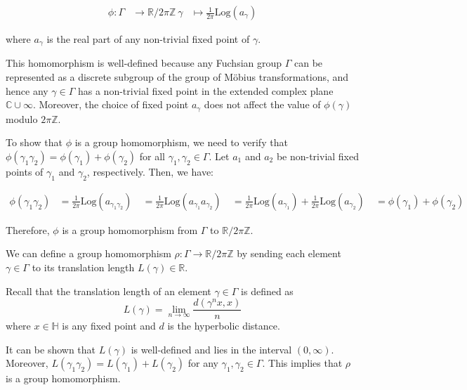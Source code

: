 \documentclass[12pt,a4paper,english]{article}
\theoremstyle{plain}
\theoremstyle{definition}
\theoremstyle{remark}
\begin{document}
\begin{align} \phi: \Gamma &\rightarrow \mathbb{R}/2\pi\mathbb{Z} \ \gamma &\mapsto \frac{1}{2\pi}\text{Log}(a_\gamma) \end{align}

where $a_\gamma$ is the real part of any non-trivial fixed point of $\gamma$.

This homomorphism is well-defined because any Fuchsian group $\Gamma$ can be represented as a discrete subgroup of the group of Möbius transformations, and hence any $\gamma \in \Gamma$ has a non-trivial fixed point in the extended complex plane $\mathbb{C}\cup{\infty}$. Moreover, the choice of fixed point $a_\gamma$ does not affect the value of $\phi(\gamma)$ modulo $2\pi\mathbb{Z}$.

To show that $\phi$ is a group homomorphism, we need to verify that $\phi(\gamma_1\gamma_2) = \phi(\gamma_1) + \phi(\gamma_2)$ for all $\gamma_1,\gamma_2 \in \Gamma$. Let $a_1$ and $a_2$ be non-trivial fixed points of $\gamma_1$ and $\gamma_2$, respectively. Then, we have:

\begin{align} \phi(\gamma_1\gamma_2) &= \frac{1}{2\pi}\text{Log}(a_{\gamma_1\gamma_2}) \ &= \frac{1}{2\pi}\text{Log}(a_{\gamma_1}a_{\gamma_2}) \ &= \frac{1}{2\pi}\text{Log}(a_{\gamma_1}) + \frac{1}{2\pi}\text{Log}(a_{\gamma_2}) \ &= \phi(\gamma_1) + \phi(\gamma_2) \end{align}

Therefore, $\phi$ is a group homomorphism from $\Gamma$ to $\mathbb{R}/2\pi\mathbb{Z}$.



We can define a group homomorphism $\rho: \Gamma \to \mathbb{R}/2\pi\mathbb{Z}$ by sending each element $\gamma \in \Gamma$ to its translation length $L(\gamma) \in \mathbb{R}$.

Recall that the translation length of an element $\gamma \in \Gamma$ is defined as $$L(\gamma) = \lim_{n \to \infty} \frac{d(\gamma^n x, x)}{n}$$ where $x \in \mathbb{H}$ is any fixed point and $d$ is the hyperbolic distance.

It can be shown that $L(\gamma)$ is well-defined and lies in the interval $(0,\infty)$. Moreover, $L(\gamma_1\gamma_2) = L(\gamma_1) + L(\gamma_2)$ for any $\gamma_1, \gamma_2 \in \Gamma$. This implies that $\rho$ is a group homomorphism.
\end{document}
